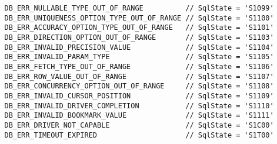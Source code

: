 \begin{verbatim}
   DB_ERR_NULLABLE_TYPE_OUT_OF_RANGE          // SqlState = 'S1099'
   DB_ERR_UNIQUENESS_OPTION_TYPE_OUT_OF_RANGE // SqlState = 'S1100'
   DB_ERR_ACCURACY_OPTION_TYPE_OUT_OF_RANGE   // SqlState = 'S1101'
   DB_ERR_DIRECTION_OPTION_OUT_OF_RANGE       // SqlState = 'S1103'
   DB_ERR_INVALID_PRECISION_VALUE             // SqlState = 'S1104'
   DB_ERR_INVALID_PARAM_TYPE                  // SqlState = 'S1105'
   DB_ERR_FETCH_TYPE_OUT_OF_RANGE             // SqlState = 'S1106'
   DB_ERR_ROW_VALUE_OUT_OF_RANGE              // SqlState = 'S1107'
   DB_ERR_CONCURRENCY_OPTION_OUT_OF_RANGE     // SqlState = 'S1108'
   DB_ERR_INVALID_CURSOR_POSITION             // SqlState = 'S1109'
   DB_ERR_INVALID_DRIVER_COMPLETION           // SqlState = 'S1110'
   DB_ERR_INVALID_BOOKMARK_VALUE              // SqlState = 'S1111'
   DB_ERR_DRIVER_NOT_CAPABLE                  // SqlState = 'S1C00'
   DB_ERR_TIMEOUT_EXPIRED                     // SqlState = 'S1T00'
\end{verbatim}


